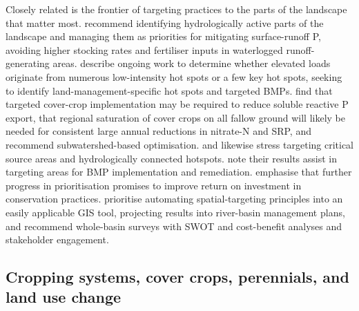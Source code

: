 \documentclass[11pt]{article}
\begin{document}
Closely related is the frontier of targeting practices to the parts of the landscape that matter most. \textcite{Melland2008} recommend identifying hydrologically active parts of the landscape and managing them as priorities for mitigating surface-runoff P, avoiding higher stocking rates and fertiliser inputs in waterlogged runoff-generating areas. \textcite{Irvine2019} describe ongoing work to determine whether elevated loads originate from numerous low-intensity hot spots or a few key hot spots, seeking to identify land-management-specific hot spots and targeted BMPs. \textcite{Speir2022} find that targeted cover-crop implementation may be required to reduce soluble reactive P export, that regional saturation of cover crops on all fallow ground will likely be needed for consistent large annual reductions in nitrate-N and SRP, and recommend subwatershed-based optimisation. \textcite{Baulch2019} and \textcite{McDowell2015} likewise stress targeting critical source areas and hydrologically connected hotspots. \textcite{Brendel2019} note their results assist in targeting areas for BMP implementation and remediation. \textcite{Makhtoumi2025} emphasise that further progress in prioritisation promises to improve return on investment in conservation practices. \textcite{Kvítek2023} prioritise automating spatial-targeting principles into an easily applicable GIS tool, projecting results into river-basin management plans, and recommend whole-basin surveys with SWOT and cost-benefit analyses and stakeholder engagement.

\subsection{Cropping systems, cover crops, perennials, and land use change}
\end{document}

